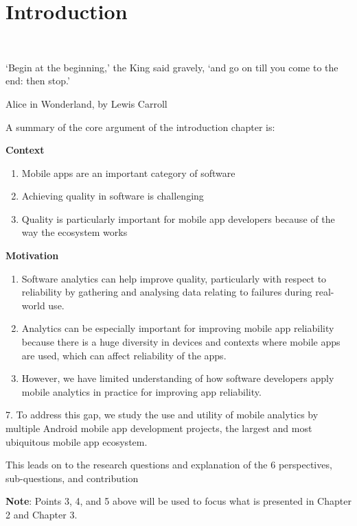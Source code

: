 \setchapterpreamble[u]{\margintoc} %
\chapter{Introduction}~\label{chapter-introduction}

\epigraph{`Begin at the beginning,' the King said gravely, `and go on till you come to the end: then stop.'}{Alice in Wonderland, by Lewis Carroll}

\bigskip

\begin{kaobox}
A summary of the core argument of the introduction chapter is:

\textbf{Context}
\begin{enumerate}
    \item Mobile apps are an important category of software
    \item Achieving quality in software is challenging
    \item Quality is particularly important for mobile app developers because of the way the ecosystem works
\end{enumerate}

\textbf{Motivation}
\begin{enumerate}[resume]
    \item Software analytics can help improve quality, particularly with respect to reliability by gathering and analysing data relating to failures during real-world use.
    \item Analytics can be especially important for improving mobile app reliability because there is a huge diversity in devices and contexts where mobile apps are used, which can affect reliability of the apps.
    \item However, we have limited understanding of how software developers apply mobile analytics in practice for improving app reliability.
\end{enumerate}

7. To address this gap, we study the use and utility of mobile analytics by multiple Android mobile app development projects, the largest and most ubiquitous mobile app ecosystem.


This leads on to the research questions and explanation of the 6 perspectives, sub-questions, and contribution

\textbf{Note}: Points 3, 4, and 5 above will be used to focus what is presented in Chapter 2 and Chapter 3.
\end{kaobox}

